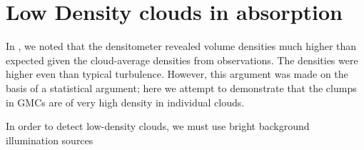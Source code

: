 \section{Low Density clouds in absorption}
In \citet{Ginsburg2011a}, we noted that the \formaldehyde densitometer revealed
volume densities much higher than expected given the cloud-average densities
from \thirteenco observations.  The densities were higher even than typical
turbulence.  However, this argument was made on the basis of a statistical argument;
here we attempt to demonstrate that the clumps in GMCs are of very high density
in individual clouds.

In order to detect low-density clouds, we must use bright background illumination sources

